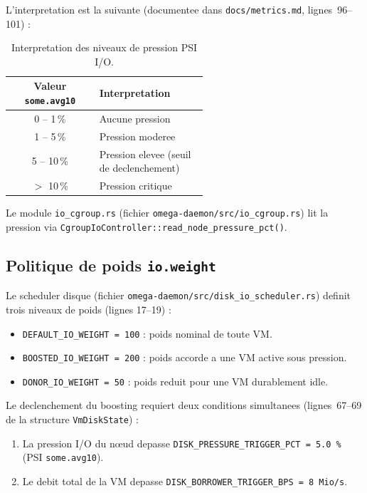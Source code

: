 L'interpretation est la suivante (documentee dans \texttt{docs/metrics.md}, lignes~96--101) :

\begin{table}[htbp]
    \centering
    \caption{Interpretation des niveaux de pression PSI I/O.}
    \label{tab:psi-interpretation}
    \begin{tabular}{c p{0.55\linewidth}}
        \toprule
        \textbf{Valeur \texttt{some.avg10}} & \textbf{Interpretation} \\
        \midrule
        0 -- 1\,\% & Aucune pression \\
        1 -- 5\,\% & Pression moderee \\
        5 -- 10\,\% & Pression elevee (seuil de declenchement) \\
        $>$ 10\,\% & Pression critique \\
        \bottomrule
    \end{tabular}
\end{table}

Le module \texttt{io\_cgroup.rs} (fichier \texttt{omega-daemon/src/io\_cgroup.rs}) lit la pression via \texttt{CgroupIoController::read\_node\_pressure\_pct()}.

\subsection{Politique de poids \texttt{io.weight}}
\label{subsec:io-weight}

Le scheduler disque (fichier \texttt{omega-daemon/src/disk\_io\_scheduler.rs}) definit trois niveaux de poids (lignes 17--19) :

\begin{itemize}
    \item \texttt{DEFAULT\_IO\_WEIGHT = 100} : poids nominal de toute VM.
    \item \texttt{BOOSTED\_IO\_WEIGHT = 200} : poids accorde a une VM active sous pression.
    \item \texttt{DONOR\_IO\_WEIGHT = 50} : poids reduit pour une VM durablement idle.
\end{itemize}

Le declenchement du boosting requiert deux conditions simultanees (lignes~67--69 de la structure \texttt{VmDiskState}) :

\begin{enumerate}
    \item La pression I/O du nœud depasse \texttt{DISK\_PRESSURE\_TRIGGER\_PCT = 5.0\,\%} (PSI \texttt{some.avg10}).
    \item Le debit total de la VM depasse \texttt{DISK\_BORROWER\_TRIGGER\_BPS = 8~Mio/s}.
\end{enumerate}

